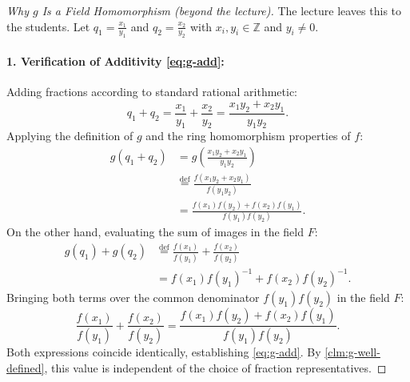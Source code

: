 \begin{content}

\begin{proof}[Why $g$ Is a Field Homomorphism (beyond the lecture)]
The lecture leaves this to the students. Let $q_1 = \frac{x_1}{y_1}$ and $q_2 = \frac{x_2}{y_2}$ with $x_i, y_i \in \mathbb{Z}$ and $y_i \ne 0$.

\paragraph{1. Verification of Additivity \eqref{eq:g-add}:}
Adding fractions according to standard rational arithmetic:
\[
q_1 + q_2 = \frac{x_1}{y_1} + \frac{x_2}{y_2} = \frac{x_1 y_2 + x_2 y_1}{y_1 y_2}.
\]
Applying the definition of $g$ and the ring homomorphism properties of $f$:
\begin{align*}
g(q_1 + q_2) &= g\left(\frac{x_1 y_2 + x_2 y_1}{y_1 y_2}\right) \\
&\stackrel{\text{def}}{=} \frac{f(x_1 y_2 + x_2 y_1)}{f(y_1 y_2)} \\
&= \frac{f(x_1)f(y_2) + f(x_2)f(y_1)}{f(y_1)f(y_2)}.
\end{align*}
On the other hand, evaluating the sum of images in the field $F$:
\begin{align*}
g(q_1) + g(q_2) &\stackrel{\text{def}}{=} \frac{f(x_1)}{f(y_1)} + \frac{f(x_2)}{f(y_2)} \\
&= f(x_1)f(y_1)^{-1} + f(x_2)f(y_2)^{-1}.
\end{align*}
Bringing both terms over the common denominator $f(y_1)f(y_2)$ in the field $F$:
\[
\frac{f(x_1)}{f(y_1)} + \frac{f(x_2)}{f(y_2)} = \frac{f(x_1)f(y_2) + f(x_2)f(y_1)}{f(y_1)f(y_2)}.
\]
Both expressions coincide identically, establishing \eqref{eq:g-add}. By \cref{clm:g-well-defined}, this value is independent of the choice of fraction representatives.


\end{proof}
\end{content}
